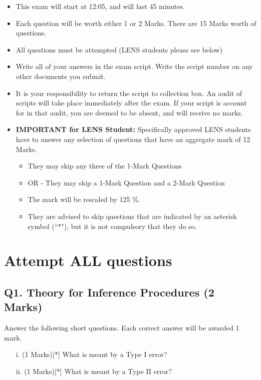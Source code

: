 \documentclass[a4paper,12pt]{article}
\begin{document}
\begin{itemize} 
	\item This exam will start at 12:05, and will last 45 minutes.
	
	\item Each question will be worth either 1 or 2 Marks. There are 15 Marks worth of questions.
	\item All questions must be attempted (LENS students please see below)
	
	\item Write all of your answers in the exam script. Write the script number on any other documents you submit.
	
	\item It is your responsibility to return the script to collection box. An audit of scripts will take place immediately after the exam. If your script is account for in that audit,  you are deemed to be absent, and will receive no marks.
	
	\item \textbf{IMPORTANT for LENS Student:}
	Specifically approved LENS students have to answer any selection of questions that have an aggregate mark of 12 Marks.  
	\begin{itemize}
		\item They may skip any three of the 1-Mark Questions
		\item OR - They may skip a 1-Mark Question and a 2-Mark Question
		\item The mark will be rescaled by 125 \%.
		\item They are advised to skip questions that are indicated by an asterisk symbol (``$\ast$"), but it is not compulsory that they do so.
	\end{itemize}
	
	
\end{itemize}
\newpage
\section*{Attempt ALL questions}

\bigskip
\subsection*{Q1. Theory for Inference Procedures (2 Marks)}
Answer the following short questions. Each correct answer will be awarded 1 mark.
\begin{itemize}
\item[i.](1 Marks)[$\ast$] What is meant by a Type I error?
\item[ii.](1 Marks)[$\ast$] What is meant by a Type II error?
\end{itemize}
%
\newpage
\end{document}
